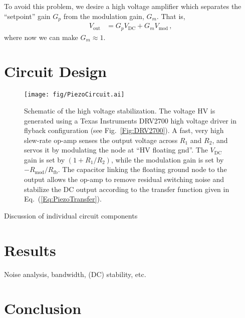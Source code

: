 \documentclass[aip,rsi,reprint]{revtex4-1} %
\begin{document}
To avoid this problem, we desire a high voltage amplifier which separates the ``setpoint'' gain $G_p$ from the modulation gain, $G_m$. That is,
\begin{align}
  V_{\text{out}} &= G_p V_{\text{DC}} + G_m V_{\text{mod}}\, \text{,}
  \label{Eq:PiezoTransfer}
\end{align}
where now we can make $G_m \approx 1$.

\section{Circuit Design}
\label{Sec:Circuit}

\begin{figure}[ht]
\texttt{[image: fig/PiezoCircuit.ai]}
\caption{Schematic of the high voltage stabilization.
The voltage HV is generated using a Texas Instruments DRV2700 high voltage driver in flyback configuration (see Fig.~\ref{Fig:DRV2700}).
A fast, very high slew-rate op-amp senses the output voltage across $R_1$ and $R_2$, and servos it by modulating the node at ``HV floating gnd''.
The $V_{\text{DC}}$ gain is set by $\left(1+R_1/R_2\right)$, while the modulation gain is set by $-R_{\text{mod}}/R_{\text{fb}}$.
The capacitor linking the floating ground node to the output allows the op-amp to remove residual switching noise and stabilize the DC output according to the transfer function given in Eq.~(\ref{Eq:PiezoTransfer}). \label{Fig:PiezoCircuit}}
\end{figure}

Discussion of individual circuit components


\section{Results}
\label{Sec:Results}
Noise analysis, bandwidth, (DC) stability, etc.


\section{Conclusion}
\label{Sec:Conclusion}



%
%
\end{document}
